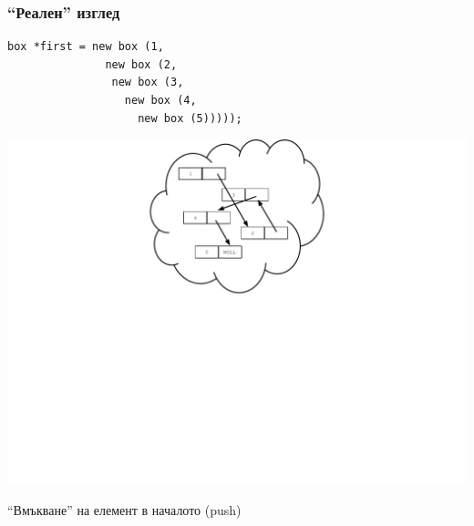 \documentclass{beamer}
\begin{document}
\begin{frame}[fragile]
\frametitle{``Реален'' изглед}

\begin{flushleft}
\begin{lstlisting}
box *first = new box (1,
               new box (2, 
                new box (3, 
                  new box (4, 
                    new box (5)))));
\end{lstlisting}  
\end{flushleft}


\includegraphics[width=14.0cm]{images/02_ll_boxcloud}

\end{frame}



\begin{frame}
\centerline{``Вмъкване'' на елемент в началото (push)}
\end{frame}
\end{document}
